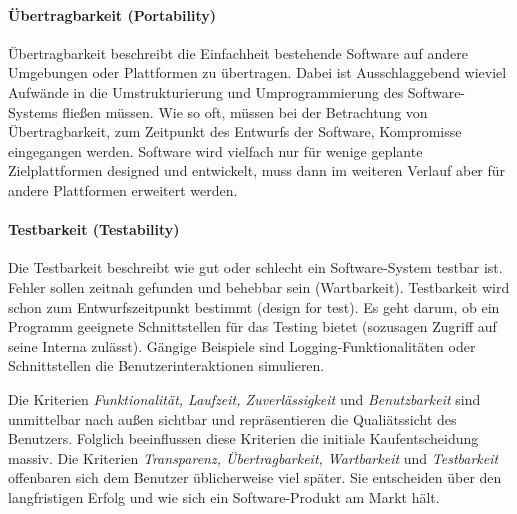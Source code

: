 \paragraph{Übertragbarkeit (Portability)} Übertragbarkeit beschreibt die Einfachheit bestehende Software auf andere Umgebungen oder Plattformen zu übertragen. Dabei ist Ausschlaggebend wieviel Aufwände in die Umstrukturierung und Umprogrammierung des Software-Systems fließen müssen. Wie so oft, müssen bei der Betrachtung von Übertragbarkeit, zum Zeitpunkt des Entwurfs der Software, Kompromisse eingegangen werden. Software wird vielfach nur für wenige geplante Zielplattformen designed und entwickelt, muss dann im weiteren Verlauf aber für andere Plattformen erweitert werden.

\paragraph{Testbarkeit (Testability)} Die Testbarkeit beschreibt wie gut oder schlecht ein Software-System testbar ist. Fehler sollen zeitnah gefunden und behebbar sein (Wartbarkeit). Testbarkeit wird schon zum Entwurfszeitpunkt bestimmt (design for test). Es geht darum, ob ein Programm geeignete Schnittstellen für das Testing bietet (sozusagen Zugriff auf seine Interna zulässt). Gängige Beispiele sind Logging-Funktionalitäten oder Schnittstellen die Benutzerinteraktionen simulieren.

Die Kriterien \textit{Funktionalität, Laufzeit, Zuverlässigkeit} und \textit{Benutzbarkeit} sind unmittelbar nach außen sichtbar und repräsentieren die Qualiätssicht des Benutzers. Folglich beeinflussen diese Kriterien die initiale Kaufentscheidung massiv. Die Kriterien \textit{Transparenz, Übertragbarkeit, Wartbarkeit} und \textit{Testbarkeit} offenbaren sich dem Benutzer üblicherweise viel später. Sie entscheiden über den langfristigen Erfolg und wie sich ein Software-Produkt am Markt hält.

